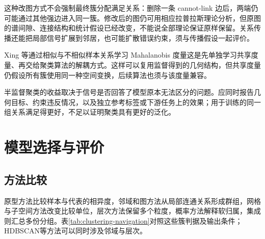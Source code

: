 这种改图方式不会强制最终簇分配满足关系：删除一条 cannot-link 边后，两端仍可能通过其他强边进入同一簇。修改后的图仍可用相应拉普拉斯理论分析，但原图的谱间隙、连接结构和统计假设已经改变，不能说全部理论保证原样保留。关系传播还能把局部信号扩展到邻居，也可能扩散错误约束，须与传播假设一起评价。

Xing 等通过相似与不相似样本关系学习 Mahalanobis 度量这是先单独学习共享度量、再交给聚类算法的解耦方式。这样可以复用监督得到的几何结构，但共享度量仍假设所有簇使用同一种空间变换，后续算法也须与该度量兼容。

半监督聚类的收益取决于信号是否回答了模型原本无法区分的问题。应同时报告几何目标、约束违反情况，以及独立参考标签或下游任务上的效果；用于训练的同一组关系满足得更好，不足以证明聚类具有更好的泛化。

\section{模型选择与评价}
\label{sec:clustering-evaluation}

\subsection{方法比较}

原型方法比较样本与代表的相异度，邻域和图方法从局部连通关系形成群组，网格与子空间方法改变比较单位，层次方法保留多个粒度，概率方法解释软归属，集成则汇总多份分组。表\ref{tab:clustering-navigation}对照这些簇判据及输出条件；HDBSCAN等方法可以同时涉及邻域与层次。

